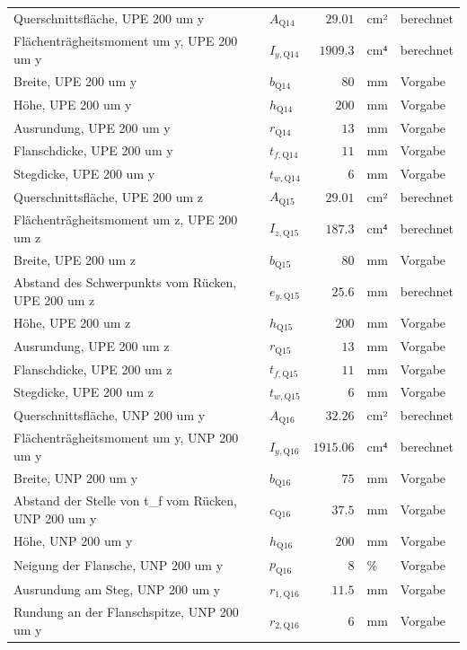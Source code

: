 \documentclass[11pt,a4paper]{article}
\begin{document}
\begin{xltabular}{\linewidth}{>{\raggedright\arraybackslash}Xlrll}
Querschnittsfläche, UPE 200 um y & $A_{\text{Q14}}$ & $29.01$ & cm² & berechnet \\
Flächenträgheitsmoment um y, UPE 200 um y & $I_{y,\text{Q14}}$ & $1909.3$ & cm⁴ & berechnet \\
Breite, UPE 200 um y & $b_{\text{Q14}}$ & $80$ & mm & Vorgabe \\
Höhe, UPE 200 um y & $h_{\text{Q14}}$ & $200$ & mm & Vorgabe \\
Ausrundung, UPE 200 um y & $r_{\text{Q14}}$ & $13$ & mm & Vorgabe \\
Flanschdicke, UPE 200 um y & $t_{f,\text{Q14}}$ & $11$ & mm & Vorgabe \\
Stegdicke, UPE 200 um y & $t_{w,\text{Q14}}$ & $6$ & mm & Vorgabe \\
Querschnittsfläche, UPE 200 um z & $A_{\text{Q15}}$ & $29.01$ & cm² & berechnet \\
Flächenträgheitsmoment um z, UPE 200 um z & $I_{z,\text{Q15}}$ & $187.3$ & cm⁴ & berechnet \\
Breite, UPE 200 um z & $b_{\text{Q15}}$ & $80$ & mm & Vorgabe \\
Abstand des Schwerpunkts vom Rücken, UPE 200 um z & $e_{y,\text{Q15}}$ & $25.6$ & mm & berechnet \\
Höhe, UPE 200 um z & $h_{\text{Q15}}$ & $200$ & mm & Vorgabe \\
Ausrundung, UPE 200 um z & $r_{\text{Q15}}$ & $13$ & mm & Vorgabe \\
Flanschdicke, UPE 200 um z & $t_{f,\text{Q15}}$ & $11$ & mm & Vorgabe \\
Stegdicke, UPE 200 um z & $t_{w,\text{Q15}}$ & $6$ & mm & Vorgabe \\
Querschnittsfläche, UNP 200 um y & $A_{\text{Q16}}$ & $32.26$ & cm² & berechnet \\
Flächenträgheitsmoment um y, UNP 200 um y & $I_{y,\text{Q16}}$ & $1915.06$ & cm⁴ & berechnet \\
Breite, UNP 200 um y & $b_{\text{Q16}}$ & $75$ & mm & Vorgabe \\
Abstand der Stelle von t\_f vom Rücken, UNP 200 um y & $c_{\text{Q16}}$ & $37.5$ & mm & Vorgabe \\
Höhe, UNP 200 um y & $h_{\text{Q16}}$ & $200$ & mm & Vorgabe \\
Neigung der Flansche, UNP 200 um y & $p_{\text{Q16}}$ & $8$ & \% & Vorgabe \\
Ausrundung am Steg, UNP 200 um y & $r_{1,\text{Q16}}$ & $11.5$ & mm & Vorgabe \\
Rundung an der Flanschspitze, UNP 200 um y & $r_{2,\text{Q16}}$ & $6$ & mm & Vorgabe \\

\end{xltabular}
\end{document}
